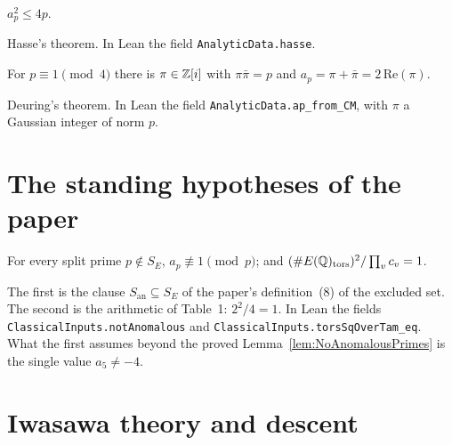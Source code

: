 \begin{assumption}
  \label{assum:HasseBound}
  \leanok
  $a_p^2 \le 4p$.

  Hasse's theorem. In Lean the field \texttt{AnalyticData.hasse}.
\end{assumption}

\begin{assumption}
  \label{assum:DeuringTrace}
  \leanok
  For $p \equiv 1 \pmod 4$ there is $\pi \in \mathbb{Z}[i]$ with $\pi\bar\pi = p$
  and $a_p = \pi + \bar\pi = 2\,\mathrm{Re}(\pi)$.

  Deuring's theorem. In Lean the field \texttt{AnalyticData.ap\_from\_CM},
  with $\pi$ a Gaussian integer of norm $p$.
\end{assumption}

\section{The standing hypotheses of the paper}

\begin{assumption}
  \label{assum:StandingHypotheses}
  \leanok
  For every split prime $p \notin S_E$, $a_p \not\equiv 1 \pmod p$; and
  $(\#E(\mathbb{Q})_{\mathrm{tors}})^2 / \prod_v c_v = 1$.

  The first is the clause $S_{\mathrm{an}} \subseteq S_E$ of the paper's
  definition~(8) of the excluded set. The second is the arithmetic of
  Table~1: $2^2/4 = 1$. In Lean the fields
  \texttt{ClassicalInputs.notAnomalous} and
  \texttt{ClassicalInputs.torsSqOverTam\_eq}. What the first assumes beyond
  the proved Lemma~\ref{lem:NoAnomalousPrimes} is the single value
  $a_5 \ne -4$.
\end{assumption}

\section{Iwasawa theory and descent}

